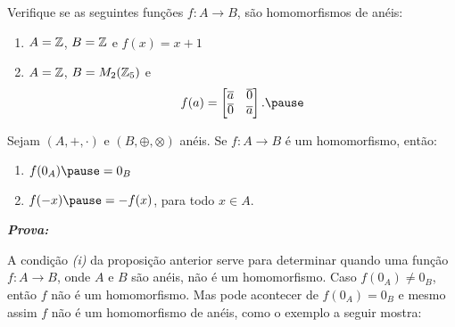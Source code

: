 \documentclass{beamer}
\begin{document}
    \begin{frame}
        \begin{exemplos}
            \begin{exemplos}
            Verifique se as seguintes fun\c{c}\~oes $f : A \to B$, \pause s\~ao homomorfismos de an\'eis:\pause
            \begin{enumerate}[label={\roman*})]
                \item $A = \mathbb{Z}$, \pause $B = \mathbb{Z}$ \pause e $f(x) = x + 1$\pause
                \item $A = \mathbb{Z}$, \pause $B = M_2(\mathbb{Z}_5)$ \pause e
                \[
                    f(a) = \begin{bmatrix}
                        \overline{a} & \overline{0}\\
                        \overline{0} & \overline{a}
                    \end{bmatrix}.\pause
                \]
            \end{enumerate}
        \end{exemplos}
        \end{exemplos}
    \end{frame}
    \begin{frame}
        \begin{proposicao}
            Sejam $(A, +, \cdot)$ e $(B, \oplus, \otimes)$ an\'eis. \pause Se $f : A \to B$ \'e um homomorfismo, \pause ent{\~a}o:\pause
            \begin{enumerate}[label={\roman*})]
                \item $f(0_{A}) \pause = 0_{B}$\pause

                \vspace{.5cm}

                \item $f(-x) \pause = -f(x)$, \pause para todo $x \in A$.\pause
            \end{enumerate}
        \end{proposicao}

        \noindent \textbf{\textit{Prova: }}
    \end{frame}

    \begin{frame}
        \begin{observacao}
            A condi\c{c}\~ao \textit{(i)} da proposi\c{c}\~ao anterior \pause serve para determinar quando uma fun\c{c}\~ao $f : A \to B$, \pause onde $A$ e $B$ s\~ao an\'eis, n\~ao \'e um homomorfismo. \pause Caso $f(0_A) \ne 0_B$, \pause ent\~ao $f$ n\~ao \'e um homomorfismo. \pause Mas pode acontecer de $f(0_A) = 0_B$ \pause e mesmo assim $f$ n\~ao \'e um homomorfismo de an\'eis, \pause como o exemplo a seguir mostra:\pause
        \end{observacao}
    \end{frame}
\end{document}
